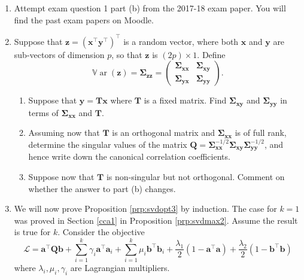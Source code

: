 \documentclass[]{book}
\providecommand{\tightlist}{%
  \setlength{\itemsep}{0pt}\setlength{\parskip}{0pt}}
\theoremstyle{definition}
\theoremstyle{definition}
\theoremstyle{definition}
\theoremstyle{remark}
\begin{document}
\begin{enumerate}
\def\labelenumi{\arabic{enumi}.}
\item
  Attempt exam question 1 part (b) from the 2017-18 exam paper. You will find the past exam papers on Moodle.
\item
  Suppose that \(\mathbf z= (\mathbf x^\top \mathbf y^\top)^\top\) is a random vector, where both \(\mathbf x\) and \(\mathbf y\) are sub-vectors of dimension \(p\), so that \(\mathbf z\) is \((2p)\times 1\). Define
  \[{\mathbb{V}\operatorname{ar}}(\mathbf z)=\boldsymbol{\Sigma}_{\mathbf z\mathbf z}=\begin{pmatrix} \boldsymbol{\Sigma}_{\mathbf x\mathbf x} & \boldsymbol{\Sigma}_{\mathbf x\mathbf y}\\\boldsymbol{\Sigma}_{\mathbf y\mathbf x} & \boldsymbol{\Sigma}_{\mathbf y\mathbf y}  \end{pmatrix}.\]

  \begin{enumerate}
  \def\labelenumii{\roman{enumii}.}
  \tightlist
  \item
    Suppose that \(\mathbf y= \mathbf T\mathbf x\) where \(\mathbf T\) is a fixed matrix. Find \(\boldsymbol{\Sigma}_{\mathbf x\mathbf y}\) and \(\boldsymbol{\Sigma}_{\mathbf y\mathbf y}\) in terms of \(\boldsymbol{\Sigma}_{\mathbf x\mathbf x}\) and \(\mathbf T\).
  \item
    Assuming now that \(\mathbf T\) is an orthogonal matrix and \(\boldsymbol{\Sigma}_{\mathbf x\mathbf x}\) is of full rank, determine the singular values of the matrix \(\mathbf Q=\boldsymbol{\Sigma}_{\mathbf x\mathbf x}^{-1/2}\boldsymbol{\Sigma}_ {\mathbf x\mathbf y}\boldsymbol{\Sigma}_{\mathbf y\mathbf y}^{-1/2}\), and hence write down the canonical correlation coefficients.
  \item
    Suppose now that \(\mathbf T\) is non-singular but not orthogonal. Comment on whether the answer to part (b) changes.
  \end{enumerate}
\item
  We will now prove Proposition \ref{prp:svdopt3} by induction.
  The case for \(k=1\) was proved in Section \ref{cca1} in Proposition \ref{prp:svdmax2}. Assume the result is true for \(k\). Consider the objective
  \[\mathcal{L} = \mathbf a^\top \mathbf Q\mathbf b+ \sum_{i=1}^k \gamma_i\mathbf a^\top \mathbf a_i + \sum_{i=1}^k \mu_i\mathbf b^\top \mathbf b_i + \frac{\lambda_1}{2}(1-\mathbf a^\top\mathbf a)+ \frac{\lambda_2}{2}(1-\mathbf b^\top\mathbf b)\]
  where \(\lambda_i, \mu_i, \gamma_i\) are Lagrangian multipliers.


\end{enumerate}
\end{document}
